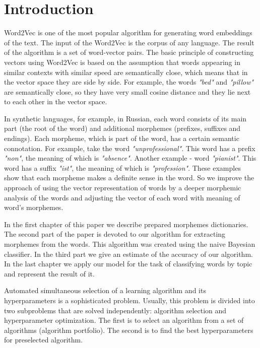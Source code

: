 \documentclass{svproc}
\begin{document}
\section{Introduction}

Word2Vec is one of the most popular algorithm for generating word embeddings of the text. The input of the Word2Vec is the corpus of any language. The result of the algorithm is a set of word-vector pairs. The basic principle of constructing vectors using Word2Vec is based on the assumption that words appearing in similar contexts with similar speed are semantically close, which means that in the vector space they are side by side. For example, the words \emph{"bed"} and \emph{"pillow"} are semantically close, so they have very small cosine distance and they lie next to each other in the vector space.

In synthetic languages, for example, in Russian, each word consists of its main part (the root of the word) and additional morphemes (prefixes, suffixes and endings). Each morpheme, which is part of the word, has a certain semantic connotation. For example, take the word \emph{"unprofessional"}. This word has a prefix \emph{"non"}, the meaning of which is \emph{"absence"}. Another example - word \emph{"pianist"}. This word has a suffix \emph{"ist"}, the meaning of which is \emph{"profession"}. These examples show that each morpheme makes a definite sense in the word. So we improve the approach of using the vector representation of words by a deeper morphemic analysis of the words and adjusting the vector of each word with meaning of word's morphemes.

In the first chapter of this paper we describe prepared morphemes dictionaries. The second part of the paper is devoted to our algorithm for extracting morphemes from the words. This algorithm was created using the naive Bayesian classifier. In the third part we give an estimate of the accuracy of our algorithm. In the last chapter we apply our model for the task of classifying words by topic and represent the result of it.










Automated simultaneous selection of a learning algorithm and its hyperparameters is a sophisticated problem. Usually, this problem is divided into two subproblems that are solved independently: algorithm selection and hyperparameter optimization. The first is to select an algorithm from a set of algorithms (algorithm portfolio). The second is to find the best hyperparameters for preselected algorithm.
\end{document}
